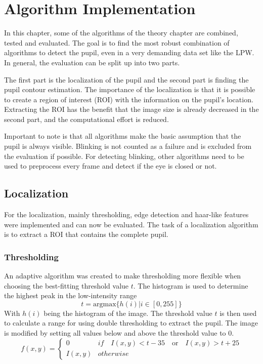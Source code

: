 \chapter{Algorithm Implementation}
In this chapter, some of the algorithms of the theory chapter are combined, tested and evaluated. The goal is to find the most robust combination of algorithms to detect the pupil, even in a very demanding data set like the LPW. In general, the evaluation can be split up into two parts. 

The first part is the localization of the pupil and the second part is finding the pupil contour estimation. The importance of the localization is that it is possible to create a region of interest (ROI) with the information on the pupil's location. Extracting the ROI has the benefit that the image size is already decreased in the second part, and the computational effort is reduced. 

Important to note is that all algorithms make the basic assumption that the pupil is always visible. Blinking is not counted as a failure and is excluded from the evaluation if possible. For detecting blinking, other algorithms need to be used to preprocess every frame and detect if the eye is closed or not. 


\section{Localization}
For the localization, mainly thresholding, edge detection and haar-like features were implemented and can now be evaluated. The task of a localization algorithm is to extract a ROI that contains the complete pupil. 

\subsection{Thresholding}
 An adaptive algorithm was created to make thresholding more flexible when choosing the best-fitting threshold value $t$. The histogram is used to determine the highest peak in the low-intensity range
\begin{equation}
    t = \text{argmax} \{h(i) | i \in [0,255]\}
\end{equation}
With $h(i)$ being the histogram of the image. The threshold value $t$ is then used to calculate a range for using double thresholding to extract the pupil. The image is modified by setting all values below and above the threshold value to 0. 
\begin{equation}
    f(x,y)= \begin{cases}
        0 &if \quad I(x,y) < t-35 \quad \text{or} \quad I(x,y) > t+25 \\
        I(x,y) &otherwise
    \end{cases}
\end{equation}


